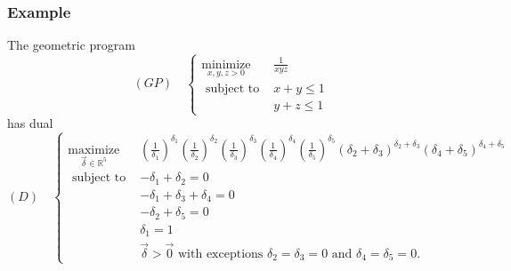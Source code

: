 \documentclass[11pt,a4paper]{article}
\begin{document}
\subsubsection*{Example}
The geometric program
$$
(G P) \quad\left\{\begin{array}{cl}
\underset{x, y, z>0}{\operatorname{minimize}} & \frac{1}{x y z} \\
\text { subject to } & x+y \leq 1 \\
& y+z \leq 1
\end{array}\right.
$$
has dual
$$ (D)\quad
\left\{\begin{aligned}
\underset{\vec{\delta} \in \mathbb{R}^5}{\operatorname{maximize}} &\left(\frac{1}{\delta_1}\right)^{\delta_1}\left(\frac{1}{\delta_2}\right)^{\delta_2}\left(\frac{1}{\delta_3}\right)^{\delta_3}\left(\frac{1}{\delta_4}\right)^{\delta_4}\left(\frac{1}{\delta_5}\right)^{\delta_5}\left(\delta_2+\delta_3\right)^{\delta_2+\delta_3}\left(\delta_4+\delta_5\right)^{\delta_4+\delta_5} \\
\text { subject to } &-\delta_1+\delta_2=0 \\
&-\delta_1+\delta_3+\delta_4=0 \\
&-\delta_2+\delta_5=0 \\
& \delta_1=1 \\
& \vec{\delta}>\vec{0} \text { with exceptions } \delta_2=\delta_3=0 \text { and } \delta_4=\delta_5=0 .
\end{aligned}\right.
$$
\end{document}
